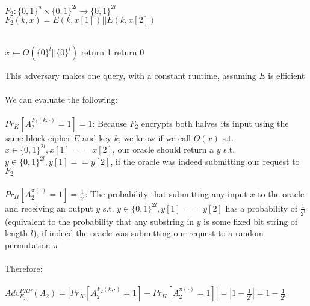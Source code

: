 \documentclass[]{article}
\begin{document}
\subsection{}
$F_2: \{0,1\}^n \times \{0,1\}^{2l} \rightarrow \{0,1\}^{2l}$
\\
$F_2(k, x) = E(k, x[1]) || E(k, x[2])$
\\\\
\begin{algorithm}[H]
	\SetAlgoLined
	$x \leftarrow O(\{0\}^l || \{0\}^l)$\;
	 {
		return 1
	}
	return 0
	\caption{$A_2$}
\end{algorithm}
This adversary makes one query, with a constant runtime, assuming $E$ is efficient
\\\\
We can evaluate the following:
\\\\
$Pr_K[A_2^{F_2(k, \cdot)} = 1] = 1$: Because $F_2$ encrypts both halves its input using the same block cipher $E$ and key $k$, we know if we call $O(x)$ s.t. $x \in \{0,1\}^{2l}, x[1] == x[2]$, our oracle should return a $y$ s.t. $y \in \{0,1\}^{2l}, y[1] == y[2]$, if the oracle was indeed submitting our request to $F_2$
\\\\
$Pr_\Pi[A_2^{\pi(\cdot)} = 1] = \frac{1}{2^l}$: The probability that submitting any input $x$ to the oracle and receiving an output $y$ s.t. $y \in \{0,1\}^{2l}, y[1] == y[2]$ has a probability of $\frac{1}{2^l}$ (equivalent to the probability that any substring in $y$ is some fixed bit string of length $l$), if indeed the oracle was submitting our request to a random permutation $\pi$
\\\\
Therefore:
\\\\
$Adv_{F_2}^{PRP}(A_2) = |Pr_K[A_2^{F_2(k, \cdot)} = 1] - Pr_\Pi[A_2^{\pi(\cdot)} = 1]| = |1 - \frac{1}{2^l}| = 1 - \frac{1}{2^l}$
\end{document}
